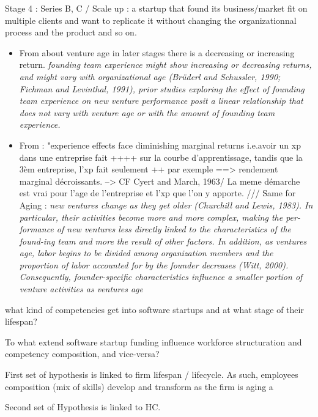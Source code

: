 \begin{itemize}
\begin{itemize}
Stage 4 : Series B, C / Scale up : a startup that found its business/market fit on multiple clients and want to replicate it without changing the organizationnal process and the product and so on.\\
\begin{itemize}
  \item From \citep{delmar2006does} about venture age in later stages there is a decreasing or increasing return. \textit{founding team experience might show increasing or decreasing returns, and might vary with organizational age (Brüderl and Schussler, 1990; Fichman and Levinthal, 1991), prior studies exploring the effect of founding team experience on new venture performance posit a linear relationship that does not vary with venture age or with the amount of founding team experience.}
  \item From \citep{delmar2006does} : "experience effects face diminishing marginal returns i.e.avoir un xp dans une entreprise fait ++++ sur la courbe d'apprentissage, tandis que la 3èm entreprise, l'xp fait seulement ++ par exemple ==> rendement marginal décroissants. --> CF Cyert and March, 1963/
  La meme démarche est vrai pour l'age de l'entreprise et l'xp que l'on y apporte. /// Same for Aging :  \textit{new ventures change as they get older (Churchill and Lewis, 1983). In particular, their activities become more and more complex, making the per-formance of new ventures less directly linked to the characteristics of the found-ing team and more the result of other factors. In addition, as ventures age, labor begins to be divided among organization members and the proportion of labor accounted for by the founder decreases (Witt, 2000). Consequently, founder-specific characteristics influence a smaller portion of venture activities as ventures age}
\end{itemize}


 what kind of competencies get into software startups and at what stage of their lifespan?

 To what extend software startup funding influence workforce structuration and competency composition, and vice-versa?


First set of hypothesis is linked to firm lifespan / lifecycle. As such, employees composition (mix of skills) develop and transform as the firm is aging a

Second set of Hypothesis is linked to HC.


\end{itemize}
\end{itemize}
